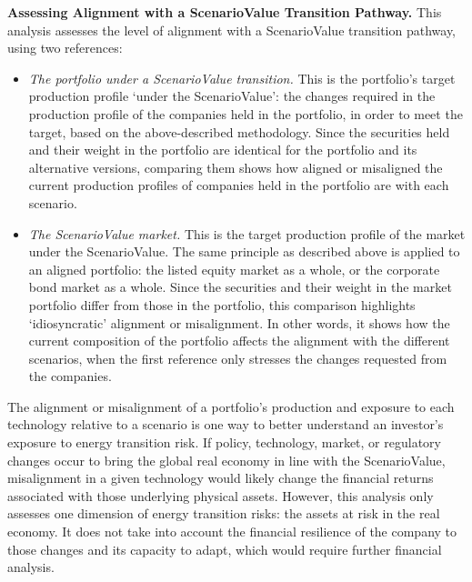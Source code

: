 \documentclass[10pt,table,a4]{article}\usepackage[]{graphicx}\usepackage[]{color}
\begin{document}
	\begin{multicols}{2}
		
		
		\textbf{Assessing Alignment with a ScenarioValue Transition Pathway. }This analysis assesses the level of alignment with a ScenarioValue transition pathway, using two references:
		
		\begin{itemize}
			\item{\textit{The portfolio under a ScenarioValue transition.} This is the portfolio's target production profile `under the ScenarioValue': the changes required in the production profile of the companies held in the portfolio, in order to meet the target, based on the above-described methodology. Since the securities held and their weight in the portfolio are identical for the portfolio and its alternative versions, comparing them shows how aligned or misaligned the current production profiles of companies held in the portfolio are with each scenario.}
			
			\item{\textit{The ScenarioValue market. }This is the target production profile of the market under the ScenarioValue. The same principle as described above is applied to an aligned portfolio: the listed equity market as a whole, or the corporate bond market as a whole. Since the securities and their weight in the market portfolio differ from those in the portfolio, this comparison highlights `idiosyncratic' alignment or misalignment. In other words, it shows how the current composition of the portfolio affects the alignment with the different scenarios, when the first reference only stresses the changes requested from the companies.}
		\end{itemize}
		
		
		The alignment or misalignment of a portfolio's production and exposure to each technology relative to a scenario is one way to better understand an investor's exposure to energy transition risk. If policy, technology, market, or regulatory changes occur to bring the global real economy in line with the ScenarioValue, misalignment in a given technology would likely change the financial returns associated with those underlying physical assets. However, this analysis only assesses one dimension of energy transition risks: the assets at risk in the real economy. It does not take into account the financial resilience of the company to those changes and its capacity to adapt, which would require further financial analysis.
		

\end{multicols}
\end{document}
